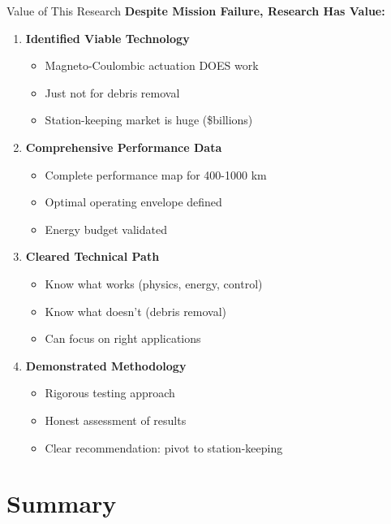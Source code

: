 \documentclass[aspectratio=169]{beamer}
\begin{document}
\begin{frame}{Value of This Research}
\textbf{Despite Mission Failure, Research Has Value:}

\vspace{0.5em}
\begin{enumerate}
    \item \textbf{Identified Viable Technology}
    \begin{itemize}
        \item Magneto-Coulombic actuation DOES work
        \item Just not for debris removal
        \item Station-keeping market is huge (\$billions)
    \end{itemize}

    \item \textbf{Comprehensive Performance Data}
    \begin{itemize}
        \item Complete performance map for 400-1000 km
        \item Optimal operating envelope defined
        \item Energy budget validated
    \end{itemize}

    \item \textbf{Cleared Technical Path}
    \begin{itemize}
        \item Know what works (physics, energy, control)
        \item Know what doesn't (debris removal)
        \item Can focus on right applications
    \end{itemize}

    \item \textbf{Demonstrated Methodology}
    \begin{itemize}
        \item Rigorous testing approach
        \item Honest assessment of results
        \item Clear recommendation: pivot to station-keeping
    \end{itemize}
\end{enumerate}
\end{frame}

\section{Summary}
\end{document}
